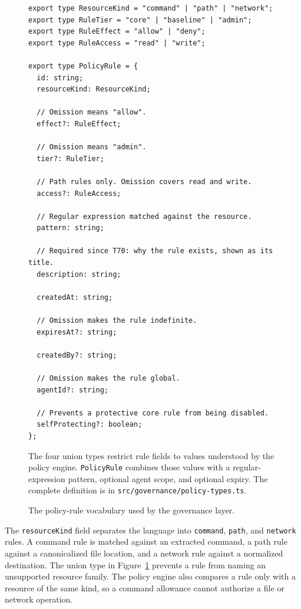 \begin{figure}[htbp]
\centering
\begin{minipage}{0.96\textwidth}
\begin{reportcodebox}
\begin{lstlisting}[style=reportcode]
export type ResourceKind = "command" | "path" | "network";
export type RuleTier = "core" | "baseline" | "admin";
export type RuleEffect = "allow" | "deny";
export type RuleAccess = "read" | "write";

export type PolicyRule = {
  id: string;
  resourceKind: ResourceKind;

  // Omission means "allow".
  effect?: RuleEffect;

  // Omission means "admin".
  tier?: RuleTier;

  // Path rules only. Omission covers read and write.
  access?: RuleAccess;

  // Regular expression matched against the resource.
  pattern: string;

  // Required since T70: why the rule exists, shown as its title.
  description: string;

  createdAt: string;

  // Omission makes the rule indefinite.
  expiresAt?: string;

  createdBy?: string;

  // Omission makes the rule global.
  agentId?: string;

  // Prevents a protective core rule from being disabled.
  selfProtecting?: boolean;
};
\end{lstlisting}
\end{reportcodebox}
\end{minipage}
\caption{The policy-rule vocabulary used by the governance layer.}
\label{fig:gov-code-rule-model}
\vspace{0.6em}
\begin{minipage}{0.96\textwidth}
{\small
The four union types restrict rule fields to values understood by the policy
engine. \texttt{PolicyRule} combines those values with a regular-expression
pattern, optional agent scope, and optional expiry. The complete definition is
in \texttt{src/governance/policy-types.ts}.\par}
\end{minipage}
\end{figure}

The \texttt{resourceKind} field separates the language into
\texttt{command}, \texttt{path}, and \texttt{network} rules. A command rule is
matched against an extracted command, a path rule against a canonicalized file
location, and a network rule against a normalized destination. The union type
in Figure~\ref{fig:gov-code-rule-model} prevents a rule from naming an
unsupported resource family. The policy engine also compares a rule only with
a resource of the same kind, so a command allowance cannot authorize a file or
network operation.

